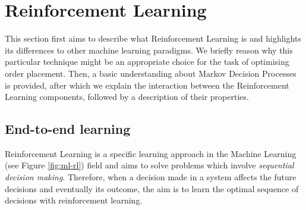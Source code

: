 \section{Reinforcement Learning}
\label{sec:reinforcement-learning}

This section first aims to describe what Reinforcement Learning is and highlights its differences to other machine learning paradigms. 
We briefly reason why this particular technique might be an appropriate choice for the task of optimising order placement. 
Then, a basic understanding about Markov Decision Processes is provided, after which we explain the interaction between the Reinforcement Learning components, followed by a description of their properties.

\subsection{End-to-end learning}

Reinforcement Learning is a specific learning approach in the Machine Learning (see Figure \ref{fig:ml-rl}) field and aims to solve problems which involve \textit{sequential decision making}.
Therefore, when a decision made in a system affects the future decisions and eventually its outcome, the aim is to learn the optimal sequence of decisions with reinforcement learning.

